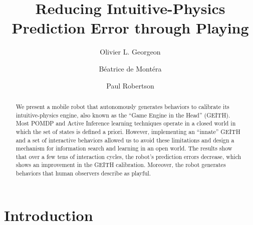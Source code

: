 \documentclass[runningheads]{llncs}
\begin{document}
%
\title{Reducing Intuitive-Physics Prediction Error through Playing}
%
%

\author{Olivier L. Georgeon  \and Béatrice de Montéra  \and Paul Robertson}

%
%
\maketitle              %
%
\begin{abstract}
We present a mobile robot that autonomously generates behaviors to calibrate its intuitive-physics engine, also known as the ``Game Engine in the Head'' (GEITH).
Most POMDP and Active Inference learning techniques operate in a closed world in which the set of states is defined a priori. 
However, implementing an ``innate'' GEITH and a set of interactive behaviors allowed us to avoid these limitations and design a mechanism for information search and learning in an open world. 
The results show that over a few tens of interaction cycles, the robot's prediction errors decrease, which shows an improvement in the GEITH calibration. 
Moreover, the robot generates behaviors that human observers describe as playful.

\end{abstract}
%
%
%
\section{Introduction}
\label{sec:intro}

\end{document}

